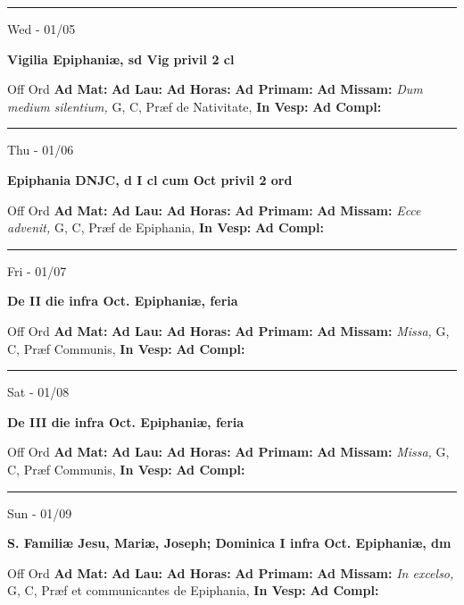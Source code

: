 \documentclass[letterpaper, 10pt]{article}
\begin{document}
\hrule
\begin{center}
Wed - 01/05
\end{center}\textbf{ \large Vigilia Epiphaniæ, \textnormal{\normalsize sd Vig privil 2 cl}}
\begin{justify}
Off Ord
\textbf{Ad Mat: }
\textbf{Ad Lau: }
\textbf{Ad Horas: }
\textbf{Ad Primam: }
\textbf{Ad Missam:} \textit{Dum medium silentium, } G, C, Præf de Nativitate, 
\textbf{In Vesp: }
\textbf{Ad Compl: }\end{justify}



\hrule
\begin{center}
Thu - 01/06
\end{center}\textbf{ \large Epiphania DNJC, \textnormal{\normalsize d I cl cum Oct privil 2 ord}}
\begin{justify}
Off Ord
\textbf{Ad Mat: }
\textbf{Ad Lau: }
\textbf{Ad Horas: }
\textbf{Ad Primam: }
\textbf{Ad Missam:} \textit{Ecce advenit, } G, C, Præf de Epiphania, 
\textbf{In Vesp: }
\textbf{Ad Compl: }\end{justify}



\hrule
\begin{center}
Fri - 01/07
\end{center}\textbf{ \large De II die infra Oct. Epiphaniæ, \textnormal{\normalsize feria}}
\begin{justify}
Off Ord
\textbf{Ad Mat: }
\textbf{Ad Lau: }
\textbf{Ad Horas: }
\textbf{Ad Primam: }
\textbf{Ad Missam:} \textit{Missa, } G, C, Præf Communis, 
\textbf{In Vesp: }
\textbf{Ad Compl: }\end{justify}



\hrule
\begin{center}
Sat - 01/08
\end{center}\textbf{ \large De III die infra Oct. Epiphaniæ, \textnormal{\normalsize feria}}
\begin{justify}
Off Ord
\textbf{Ad Mat: }
\textbf{Ad Lau: }
\textbf{Ad Horas: }
\textbf{Ad Primam: }
\textbf{Ad Missam:} \textit{Missa, } G, C, Præf Communis, 
\textbf{In Vesp: }
\textbf{Ad Compl: }\end{justify}



\hrule
\begin{center}
Sun - 01/09
\end{center}\textbf{ \large S. Familiæ Jesu, Mariæ, Joseph; Dominica I infra Oct. Epiphaniæ, \textnormal{\normalsize dm}}
\begin{justify}
Off Ord
\textbf{Ad Mat: }
\textbf{Ad Lau: }
\textbf{Ad Horas: }
\textbf{Ad Primam: }
\textbf{Ad Missam:} \textit{In excelso, } G, C, Præf et communicantes de Epiphania, 
\textbf{In Vesp: }
\textbf{Ad Compl: }\end{justify}
\end{document}
